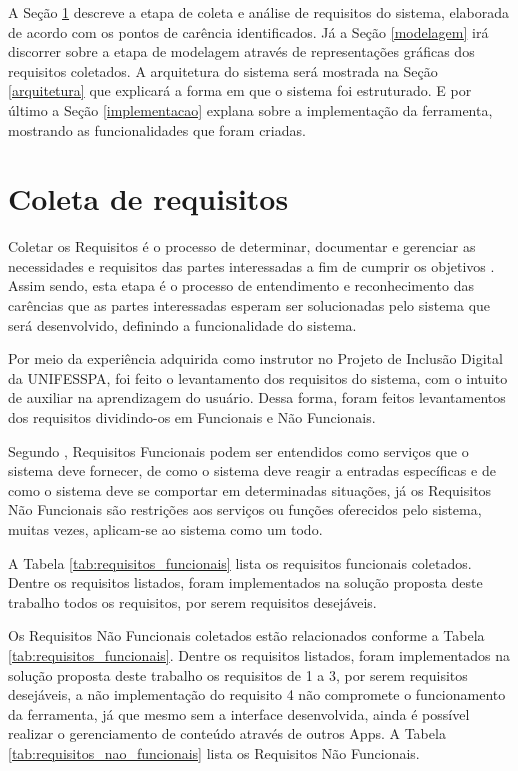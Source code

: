 A Seção \ref{coleta} descreve a etapa de coleta e análise de requisitos do sistema, elaborada de acordo com os pontos de carência identificados. Já a Seção \ref{modelagem} irá discorrer sobre a etapa de modelagem através de representações gráficas dos requisitos coletados. A arquitetura do sistema será mostrada na Seção \ref{arquitetura} que explicará a forma em que o sistema foi estruturado. E por último a Seção \ref{implementacao} explana sobre a implementação da ferramenta, mostrando as funcionalidades que foram criadas.

\section{Coleta de requisitos}
\label{coleta}

Coletar os Requisitos é o processo de determinar, documentar e gerenciar as necessidades e requisitos das partes interessadas a fim de cumprir os objetivos \cite{pmbok2017}. Assim sendo, esta etapa é o processo de entendimento e reconhecimento das carências que as partes interessadas esperam ser solucionadas pelo sistema que será desenvolvido, definindo a funcionalidade do sistema.

Por meio da experiência adquirida como instrutor no Projeto de Inclusão Digital da UNIFESSPA, foi feito o levantamento dos requisitos do sistema, com o intuito de auxiliar na aprendizagem do usuário. Dessa forma, foram feitos levantamentos dos requisitos dividindo-os em Funcionais e Não Funcionais.

Segundo , Requisitos Funcionais podem ser entendidos como serviços que o sistema deve fornecer, de como o sistema deve reagir a entradas específicas e de como o sistema deve se comportar em determinadas situações, já os Requisitos Não Funcionais são restrições aos serviços ou funções oferecidos pelo sistema, muitas vezes, aplicam-se ao sistema como um todo.

A Tabela \ref{tab:requisitos_funcionais} lista os requisitos funcionais coletados. Dentre os requisitos listados, foram implementados na solução proposta deste trabalho todos os requisitos, por serem requisitos desejáveis.




Os Requisitos Não Funcionais coletados estão relacionados conforme a Tabela \ref{tab:requisitos_funcionais}. Dentre os requisitos listados, foram implementados na solução proposta deste trabalho os requisitos de 1 a 3, por serem requisitos desejáveis, a não implementação do requisito 4 não compromete o funcionamento da ferramenta, já que mesmo sem a interface desenvolvida, ainda é possível realizar o gerenciamento de conteúdo através de outros Apps. A Tabela \ref{tab:requisitos_nao_funcionais} lista os Requisitos Não Funcionais.


